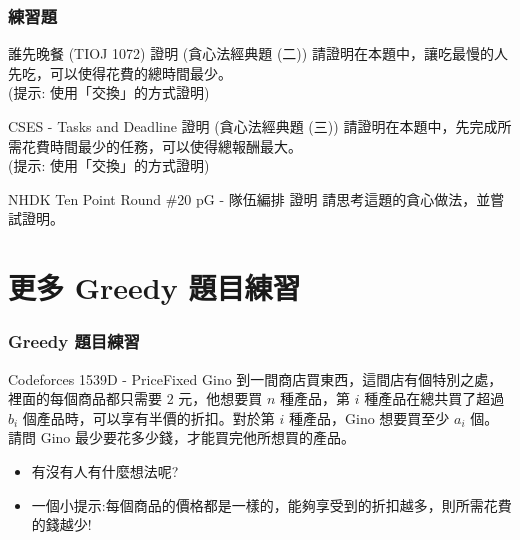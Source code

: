 \documentclass[aspectratio=169]{beamer}
\begin{document}
\begin{frame}
\frametitle{練習題}
    \begin{block}{誰先晚餐 (TIOJ 1072) 證明 (貪心法經典題 (二))}
        請證明在本題中，讓吃最慢的人先吃，可以使得花費的總時間最少。 \\
        (提示: 使用「交換」的方式證明)
    \end{block}
    \begin{block}{CSES - Tasks and Deadline 證明 (貪心法經典題 (三))}
        請證明在本題中，先完成所需花費時間最少的任務，可以使得總報酬最大。\\
        (提示: 使用「交換」的方式證明)
    \end{block}
    \begin{block}{NHDK Ten Point Round \#20 pG - 隊伍編排 證明}
        請思考這題的貪心做法，並嘗試證明。
    \end{block}
\end{frame}

\section{更多 Greedy 題目練習}

\begin{frame}
\frametitle{Greedy 題目練習}
    \begin{block}{Codeforces 1539D - PriceFixed}
        Gino 到一間商店買東西，這間店有個特別之處，裡面的每個商品都只需要 $2$ 元，他想要買 $n$ 種產品，第 $i$ 種產品在總共買了超過 $b_i$ 個產品時，可以享有半價的折扣。對於第 $i$ 種產品，Gino 想要買至少 $a_i$ 個。請問 Gino 最少要花多少錢，才能買完他所想買的產品。
    \end{block}
    \begin{itemize}
        \item<1-> 有沒有人有什麼想法呢?
        \item<2-> 一個小提示:每個商品的價格都是一樣的，能夠享受到的折扣越多，則所需花費的錢越少!
    \end{itemize}
\end{frame}
\end{document}

